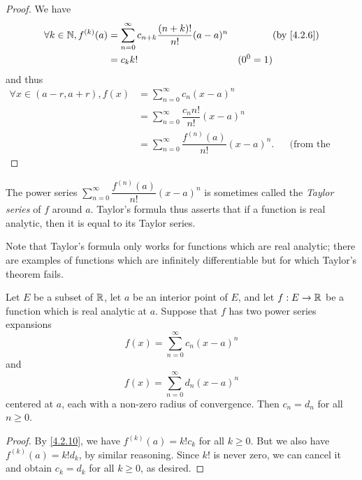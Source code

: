 \begin{proof}
  We have
  \begin{align*}
    \forall k \in \N, f^{(k)}(a) & = \sum_{n = 0}^\infty c_{n + k} \dfrac{(n + k)!}{n!} (a - a)^n &           & \text{(by \cref{4.2.6})} \\
                                 & = c_k k!                                                       & (0^0 = 1)
  \end{align*}
  and thus
  \begin{align*}
    \forall x \in (a - r, a + r), f(x) & = \sum_{n = 0}^\infty c_n (x - a)^n                                                        \\
                                       & = \sum_{n = 0}^\infty \dfrac{c_n n!}{n!} (x - a)^n                                         \\
                                       & = \sum_{n = 0}^\infty \dfrac{f^{(n)}(a)}{n!} (x - a)^n. &  & \text{(from the proof above)}
  \end{align*}
\end{proof}

\begin{note}
  The power series \(\sum_{n = 0}^\infty \dfrac{f^{(n)}(a)}{n!} (x - a)^n\) is sometimes called the \emph{Taylor series} of \(f\) around \(a\).
  Taylor's formula thus asserts that if a function is real analytic, then it is equal to its Taylor series.
\end{note}

\begin{rmk}\label{4.2.11}
  Note that Taylor's formula only works for functions which are real analytic;
  there are examples of functions which are infinitely differentiable but for which Taylor's theorem fails.
\end{rmk}

\begin{cor}\label{4.2.12}
  Let \(E\) be a subset of \(\mathbb{R}\), let \(a\) be an interior point of \(E\), and let \(f : E \to \mathbb{R}\) be a function which is real analytic at \(a\).
  Suppose that \(f\) has two power series expansions
  \[
    f(x) = \sum_{n = 0}^\infty c_n (x - a)^n
  \]
  and
  \[
    f(x) = \sum_{n = 0}^\infty d_n (x - a)^n
  \]
  centered at \(a\), each with a non-zero radius of convergence.
  Then \(c_n = d_n\) for all \(n \geq 0\).
\end{cor}

\begin{proof}
  By \cref{4.2.10}, we have \(f^{(k)}(a) = k! c_k\) for all \(k \geq 0\).
  But we also have \(f^{(k)}(a) = k! d_k\), by similar reasoning.
  Since \(k!\) is never zero, we can cancel it and obtain \(c_k = d_k\) for all \(k \geq 0\), as desired.
\end{proof}

